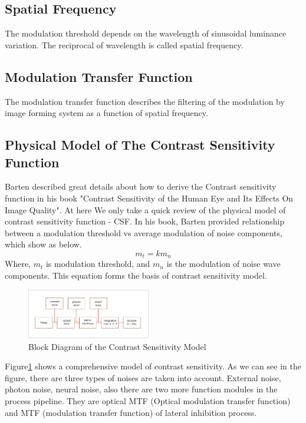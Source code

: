 \documentclass{article}
\begin{document}
\subsection{Spatial Frequency}
The modulation threshold depends on the wavelength of sinusoidal luminance variation. The reciprocal of wavelength is called spatial frequency. \\

\subsection{Modulation Transfer Function}
The modulation transfer function describes the filtering of the modulation by image forming system as a function of spatial frequency.

\subsection{Physical Model of The Contrast Sensitivity Function}
Barten described great details about how to derive the Contrast sensitivity function in his book "Contrast Sensitivity of the Human Eye and Its Effects On Image Quality". At here We only take a quick review of the physical model of contrast sensitivity function - CSF. 
In his book, Barten provided relationship between a modulation threshold vs average modulation of noise components, which show as below.
\begin{equation}
    \label{eq:mt_kmn}
    m_t = km_n
\end{equation}
Where, $m_t$ is modulation threshold, and $m_n$ is the modulation of noise wave components. This equation forms the basis of contrast sensitivity model. 
\begin{figure}[h]
    \centering
    \includegraphics[width=0.48\textwidth]{CSF-Diagram.png}
    \caption{Block Diagram of the Contrast Sensitivity Model}
    \label{fig:csf_diagram}
\end{figure}
Figure\ref{fig:csf_diagram} shows a comprehensive model of contrast sensitivity.  
As we can see in the figure, there are three types of noises are taken into account. External noise, photon noise, neural noise, also there are two more function modules in the process pipeline. They are optical MTF (Optical modulation transfer function) and MTF (modulation transfer function) of lateral inhibition process. \\
\end{document}
